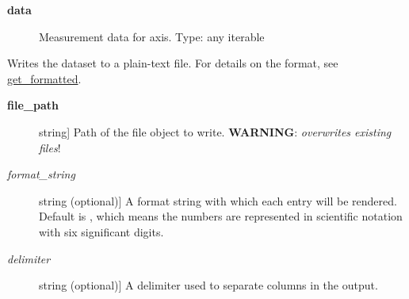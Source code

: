\documentclass[letterpaper,10pt,english]{sphinxmanual}
\begin{document}
\begin{fulllineitems}
\begin{fulllineitems}
\begin{description}
\item[{\textbf{data}}] \leavevmode
Measurement data for axis. Type: any iterable

\end{description}

\end{fulllineitems}


\begin{fulllineitems}
\label{api/kafe:kafe.dataset.Dataset.write_formatted}
Writes the dataset to a plain-text file. For details on the format, see {\hyperref[api/kafe:get-formatted]{get\_formatted}}.
\begin{description}
\item[{\textbf{file\_path}}] \leavevmode{[}string{]}
Path of the file object to write. \textbf{WARNING}: \emph{overwrites existing files}!

\item[{\emph{format\_string}}] \leavevmode{[}string (optional){]}
A format string with which each entry will be rendered. Default is , which means
the numbers are represented in scientific notation with six significant digits.

\item[{\emph{delimiter}}] \leavevmode{[}string (optional){]}
A delimiter used to separate columns in the output.

\end{description}

\end{fulllineitems}


\end{fulllineitems}

\end{document}
